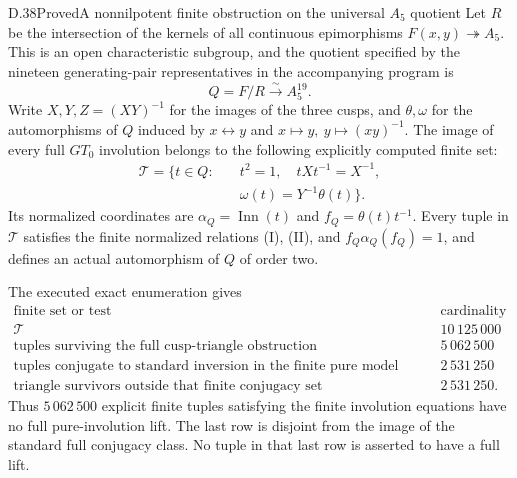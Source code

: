 \begin{claim}{D.38}{Proved}{A nonnilpotent finite obstruction on the universal \(A_5\) quotient}
Let $R$ be the intersection of the kernels of all continuous
epimorphisms $\widehat F(x,y)\twoheadrightarrow A_5$.
This is an open characteristic subgroup, and the quotient
specified by the nineteen generating-pair representatives in
the accompanying program is
\[
                 Q=F/R\xrightarrow{\ \sim\ } A_5^{19}.
                                                               \tag{D.38a}
\]
Write $X,Y,Z=(XY)^{-1}$ for the images of the three cusps,
and $\theta,\omega$ for the automorphisms of $Q$ induced by
$x\leftrightarrow y$ and $x\mapsto y,\ y\mapsto(xy)^{-1}$.
The image of every full $GT_0$ involution belongs to the
following explicitly computed finite set:
\[
\begin{split}
 \mathcal T=\{t\in Q:\quad&
 t^2=1,\quad tXt^{-1}=X^{-1},\\
 &\omega(t)=Y^{-1}\theta(t)\}.
\end{split}                                                     \tag{D.38b}
\]
Its normalized coordinates are
$\alpha_Q=\operatorname{Inn}(t)$ and
$f_Q=\theta(t)t^{-1}$.
Every tuple in $\mathcal T$ satisfies the finite
normalized relations (I), (II), and
$f_Q\alpha_Q(f_Q)=1$, and defines an actual automorphism
of $Q$ of order two.

The executed exact enumeration gives
\[
\begin{array}{l|r}
\text{finite set or test}&\text{cardinality}\\ \hline
\mathcal T&10\,125\,000\\
\text{tuples surviving the full cusp-triangle obstruction}
       &5\,062\,500\\
\text{tuples conjugate to standard inversion in the finite
pure model (D.38f)}&2\,531\,250\\
\text{triangle survivors outside that finite conjugacy set}
       &2\,531\,250 .
\end{array}                                                     \tag{D.38c}
\]
Thus $5\,062\,500$ explicit finite tuples satisfying the
finite involution equations have no full pure-involution
lift.  The last row is disjoint from the image of the
standard full conjugacy class.  No tuple in that last
row is asserted to have a full lift.
\end{claim}
